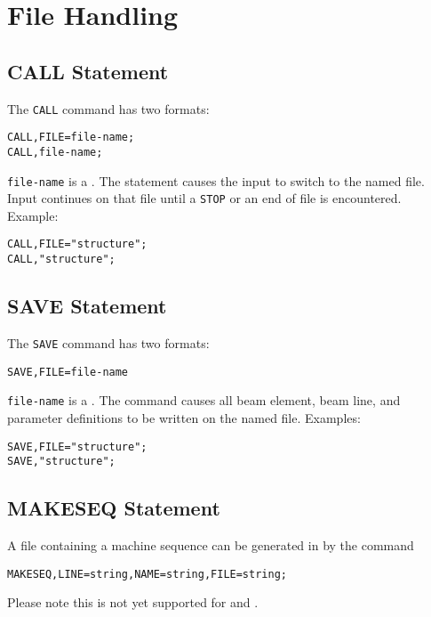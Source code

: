 \section{File Handling} 
 
\subsection{CALL Statement}
\label{sec:call}
The \texttt{CALL} command has two formats:
\begin{verbatim}
CALL,FILE=file-name;
CALL,file-name;
\end{verbatim}
\texttt{file-name} is a .
The statement causes the input to switch to the named file.
Input continues on that file until a \texttt{STOP} or an end of file
is encountered. 
\noindent Example:
\begin{verbatim}
CALL,FILE="structure";
CALL,"structure";
\end{verbatim}

\subsection{SAVE Statement}
\label{sec:save}
The \texttt{SAVE} command has two formats:
\begin{verbatim}
SAVE,FILE=file-name
\end{verbatim}
\texttt{file-name} is a .
The command causes all beam element, beam line, and parameter definitions
to be written on the named file.
\noindent Examples:
\begin{verbatim}
SAVE,FILE="structure";
SAVE,"structure";
\end{verbatim}

\subsection{MAKESEQ Statement}
\label{sec:makeseq}
A file containing a machine sequence can be generated in \opal by the
command 
\begin{verbatim}
MAKESEQ,LINE=string,NAME=string,FILE=string;
\end{verbatim}

Please note this is not yet supported for \opalt and \opalcycl .


